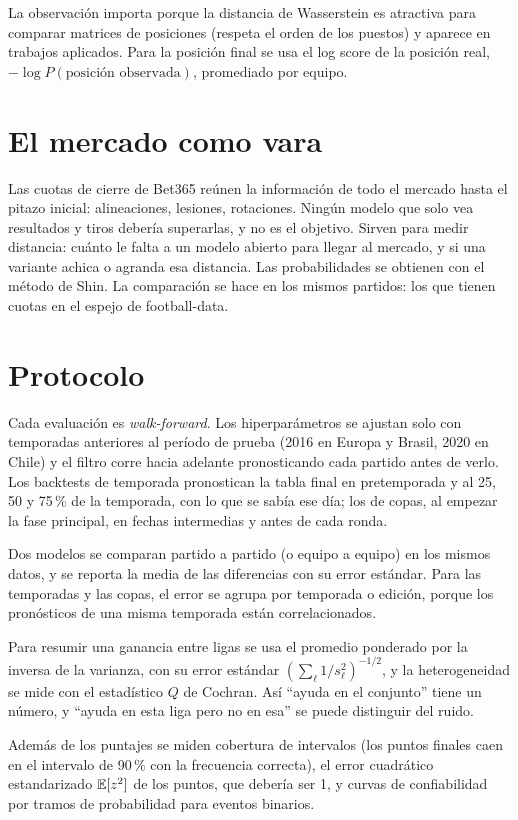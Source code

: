 La observación importa porque la distancia de Wasserstein es atractiva para comparar matrices de posiciones (respeta el orden de los puestos) y aparece en trabajos aplicados. Para la posición final se usa el log score de la posición real, $-\log P(\text{posición observada})$, promediado por equipo.

\section{El mercado como vara}

Las cuotas de cierre de Bet365 reúnen la información de todo el mercado hasta el pitazo inicial: alineaciones, lesiones, rotaciones. Ningún modelo que solo vea resultados y tiros debería superarlas, y no es el objetivo. Sirven para medir distancia: cuánto le falta a un modelo abierto para llegar al mercado, y si una variante achica o agranda esa distancia. Las probabilidades se obtienen con el método de Shin. La comparación se hace en los mismos partidos: los que tienen cuotas en el espejo de football-data.

\section{Protocolo}

 Cada evaluación es \emph{walk-forward}. Los hiperparámetros se ajustan solo con temporadas anteriores al período de prueba (2016 en Europa y Brasil, 2020 en Chile) y el filtro corre hacia adelante pronosticando cada partido antes de verlo. Los backtests de temporada pronostican la tabla final en pretemporada y al 25, 50 y 75\,\% de la temporada, con lo que se sabía ese día; los de copas, al empezar la fase principal, en fechas intermedias y antes de cada ronda.

 Dos modelos se comparan partido a partido (o equipo a equipo) en los mismos datos, y se reporta la media de las diferencias con su error estándar. Para las temporadas y las copas, el error se agrupa por temporada o edición, porque los pronósticos de una misma temporada están correlacionados.

 Para resumir una ganancia entre ligas se usa el promedio ponderado por la inversa de la varianza, con su error estándar $(\sum_\ell1/s_\ell^2)^{-1/2}$, y la heterogeneidad se mide con el estadístico $Q$ de Cochran. Así ``ayuda en el conjunto'' tiene un número, y ``ayuda en esta liga pero no en esa'' se puede distinguir del ruido.

 Además de los puntajes se miden cobertura de intervalos (los puntos finales caen en el intervalo de 90\,\% con la frecuencia correcta), el error cuadrático estandarizado $\mathbb{E}[z^2]$ de los puntos, que debería ser 1, y curvas de confiabilidad por tramos de probabilidad para eventos binarios.
